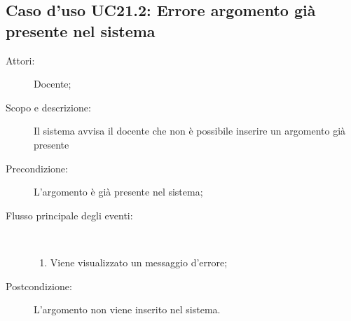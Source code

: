\subsection{Caso d'uso UC21.2: Errore argomento già presente nel sistema}\begin{description}
	\item[Attori:] Docente;
	\item[Scopo e descrizione:] Il sistema avvisa il docente che non è possibile inserire un argomento già presente
	\item[Precondizione:] L'argomento è già presente nel sistema;
	
	\item[Flusso principale degli eventi:] \ 
	\begin{enumerate}
		\item Viene visualizzato un messaggio d'errore;
		
	\end{enumerate}
	\item[Postcondizione:] L'argomento non viene inserito nel sistema.
\end{description}
\hypertarget{UC21.3}{}
